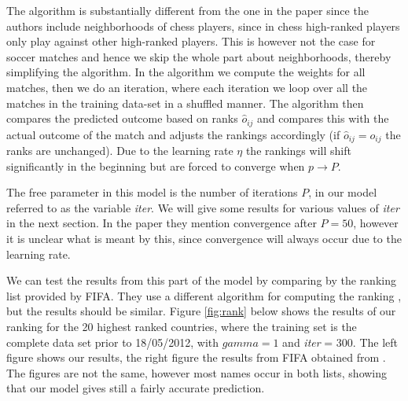\documentclass{llncs}
\begin{document}
The algorithm is substantially different from the one in the paper since the authors include neighborhoods of chess players, since in chess high-ranked players only play against other high-ranked players. This is however not the case for soccer matches and hence we skip the whole part about neighborhoods, thereby simplifying the algorithm. In the algorithm we compute the weights for all matches, then we do an iteration, where each iteration we loop over all the matches in the training data-set in a shuffled manner. The algorithm then compares the predicted outcome based on ranks $\hat{o}_{ij}$ and compares this with the actual outcome of the match and adjusts the rankings accordingly (if $\hat{o}_{ij} = o_{ij}$ the ranks are unchanged). Due to the learning rate $\eta$ the rankings will shift significantly in the beginning but are forced to converge when $p \rightarrow P$.

The free parameter in this model is the number of iterations $P$, in our model referred to as the variable \emph{iter}. We will give some results for various values of \emph{iter} in the next section. In the paper they mention convergence after $P = 50$, however it is unclear what is meant by this, since convergence will always occur due to the learning rate.

We can test the results from this part of the model by comparing by the ranking list provided by FIFA. They use a different algorithm for computing the ranking \cite{FIFAcalc}, but the results should be similar. Figure \ref{fig:rank} below shows the results of our ranking for the 20 highest ranked countries, where the training set is the complete data set prior to 18/05/2012, with $gamma = 1$ and \emph{iter} = 300. The left figure shows our results, the right figure the results from FIFA obtained from \cite{FIFAranking}. The figures are not the same, however most names occur in both lists, showing that our model gives still a fairly accurate prediction.
\end{document}
